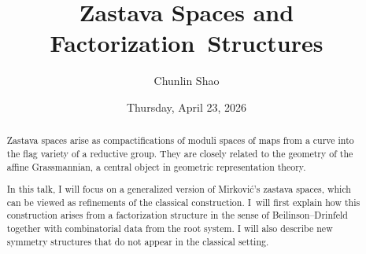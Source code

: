 \documentclass{UAmathtalk}
\author{Chunlin Shao}
\title{Zastava Spaces and Factorization~Structures}
\date{Thursday, April 23, 2026}
\begin{document}
\maketitle

\begin{abstract}
Zastava spaces arise as compactifications of moduli spaces of maps from a curve into the flag variety of a reductive group. They are closely related to the geometry of the affine Grassmannian, a central object in geometric representation theory.

In this talk, I will focus on a generalized version of Mirković’s zastava spaces, which can be viewed as refinements of the classical construction. I~will first explain how this construction arises from a factorization structure in the sense of Beilinson--Drinfeld together with combinatorial data from the root system. I will also describe new symmetry structures that do not appear in the classical setting.
\end{abstract}
\end{document}
